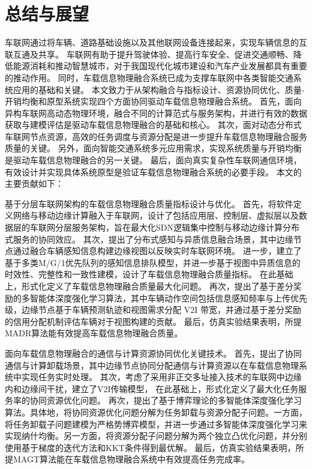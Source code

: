 \chapter{总结与展望}\label{section 6}
\removelofgap
\removelotgap
车联网通过将车辆、道路基础设施以及其他联网设备连接起来，实现车辆信息的互联互通及共享。
车联网有助于提升驾驶体验、提高行车安全、促进交通顺畅、降低能源消耗和推动智慧城市，对于我国现代化城市建设和汽车产业发展都具有重要的推动作用。
同时，车载信息物理融合系统已成为支撑车联网中各类智能交通系统应用的基础和关键。
本文致力于从架构融合与指标设计、资源协同优化、质量-开销均衡和原型系统实现四个方面协同驱动车载信息物理融合系统。
首先，面向异构车联网高动态物理环境，融合不同的计算范式与服务架构，并进行有效的数据获取与建模评估是驱动车载信息物理融合的基础和核心。
其次，面对动态分布式车联网节点资源，高效的任务调度与资源分配是进一步提升车载信息物理融合服务质量的关键。
另外，面向智能交通系统多元应用需求，实现系统质量与开销均衡是驱动车载信息物理融合的另一关键。
最后，面向真实复杂性车联网通信环境，有效设计并实现具体系统原型是验证车载信息物理融合系统的必要手段。
本文的主要贡献如下：

 基于分层车联网架构的车载信息物理融合质量指标设计与优化。
首先，将软件定义网络与移动边缘计算融入于车联网，设计了包括应用层、控制层、虚拟层以及数据层的车联网分层服务架构，旨在最大化SDN逻辑集中控制与移动边缘计算分布式服务的协同效应。
其次，提出了分布式感知与异质信息融合场景，其中边缘节点通过融合车辆感知信息构建边缘视图以反映实时车联网环境。
进一步，建立了基于多类M/G/1优先队列的感知信息排队模型，并进一步基于视图中异质信息的时效性、完整性和一致性建模，设计了车载信息物理融合质量指标。
在此基础上，形式化定义了车载信息物理融合质量最大化问题。
再次，提出了基于差分奖励的多智能体深度强化学习算法，其中车辆动作空间包括信息感知频率与上传优先级，边缘节点基于车辆预测轨迹和视图需求分配 V2I 带宽，并通过基于差分奖励的信用分配机制评估车辆对于视图构建的贡献。
最后，仿真实验结果表明，所提MADR算法能有效提高车载信息物理融合质量。

 面向车载信息物理融合的通信与计算资源协同优化关键技术。
首先，提出了协同通信与计算卸载场景，其中边缘节点协同分配通信与计算资源以在车载信息物理系统中实现任务实时处理。
其次，考虑了采用非正交多址接入技术的车联网中边缘内和边缘间干扰，建立了V2I传输模型，
在此基础上，形式化定义了最大化任务服务率的协同资源优化问题。
再次，提出了基于博弈理论的多智能体深度强化学习算法。具体地，将协同资源优化问题分解为任务卸载与资源分配子问题。一方面，将任务卸载子问题建模为严格势博弈模型，并进一步通过多智能体深度强化学习来实现纳什均衡。另一方面，将资源分配子问题分解为两个独立凸优化问题，并分别使用基于梯度的迭代方法和KKT条件得到最优解。
最后，仿真实验结果表明，所提MAGT算法能在车载信息物理融合系统中有效提高任务完成率。

